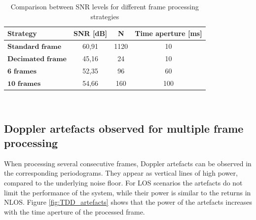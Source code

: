 		\begin{table}[H]
		    \centering 
		    \begin{tabular}{|p{9em} c c c |}
		    \hline
		    \rowcolor{bluepoli!40} %
		     \textbf{Strategy} & \textbf{SNR [dB]} & \textbf{N} & \textbf{Time aperture [ms]} \T\B \\
		    \hline \hline
		    $\textbf{Standard frame}$ & 60,91 & 1120 & 10 \T\B \\
		    $\textbf{Decimated frame}$ & 45,16 & 24 & 10 \T\B\\
		    $\textbf{6 frames}$ & 52,35 & 96 & 60  \T\B\\
		    $\textbf{10 frames}$ & 54,66 & 160 & 100  \T\B\\
		
		    \hline
		    \end{tabular}
		    \\[10pt]
		    \caption{Comparison between SNR levels for different frame processing strategies}
		    \label{table:TDDstratcomparison}
		\end{table}
		

	\subsection{Doppler artefacts observed for multiple frame processing}

		When processing several consecutive frames, Doppler artefacts can be observed in the corresponding periodograms.
		They appear as vertical lines of high power, compared to the underlying noise floor.
		For LOS scenarios the artefacts do not limit the performance of the system, while their power is similar to the returns in NLOS.
		Figure \ref{fig:TDD_artefacts} shows that the power of the artefacts increases with the time aperture of the processed frame.
		
